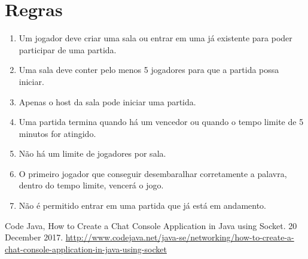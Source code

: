 \documentclass[conference]{IEEEtran}
\begin{document}
\section{Regras}
\begin{enumerate}
\item Um jogador deve criar uma sala ou entrar em uma já existente para poder participar de uma partida.
\item Uma sala deve conter pelo menos 5 jogadores para que a partida possa iniciar.
\item Apenas o host da sala pode iniciar uma partida.
\item Uma partida termina quando há um vencedor ou quando o tempo limite de 5 minutos for atingido.
\item Não há um limite de jogadores por sala.
\item O primeiro jogador que conseguir desembaralhar corretamente a palavra, dentro do tempo limite, vencerá o jogo.
\item Não é permitido entrar em uma partida que já está em andamento.
\end{enumerate}

\begin{thebibliography}{00}
 Code Java, How to Create a Chat Console Application in Java using Socket. 20 December 2017. \url{http://www.codejava.net/java-se/networking/how-to-create-a-chat-console-application-in-java-using-socket}
\end{thebibliography}
\end{document}
